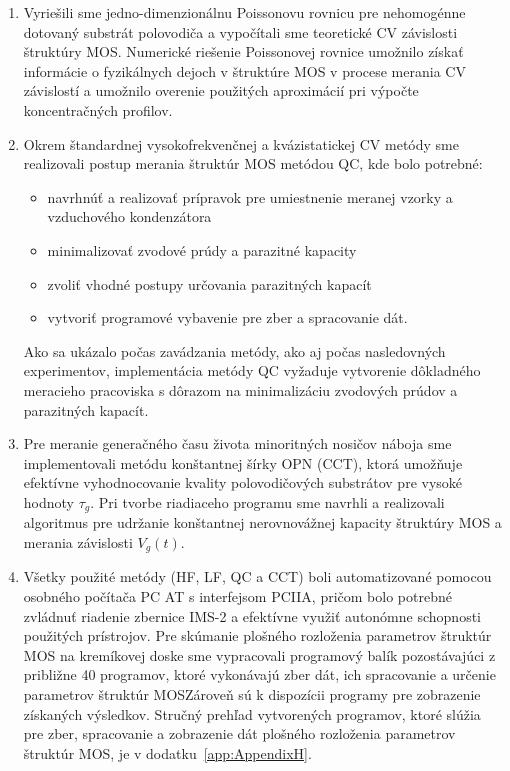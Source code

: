\begin{enumerate}

\item Vyriešili sme jedno-dimenzionálnu Poissonovu rovnicu pre
  nehomogénne dotovaný substrát polovodiča a vypočítali sme teoretické
  CV závislosti štruktúry MOS\@. Numerické riešenie Poissonovej
  rovnice umožnilo získať informácie o fyzikálnych dejoch v štruktúre
  MOS v procese merania CV závislostí a umožnilo overenie použitých
  aproximácií pri výpočte koncentračných profilov.

\item Okrem štandardnej vysokofrekvenčnej a kvázistatickej CV metódy
  sme realizovali postup merania štruktúr MOS metódou QC, kde bolo
  potrebné:

\begin{itemize}
\item navrhnúť a realizovať prípravok pre umiestnenie meranej vzorky a
  vzduchového kondenzátora
\item  minimalizovať zvodové prúdy a parazitné kapacity
\item zvoliť vhodné postupy určovania parazitných kapacít
\item vytvoriť programové vybavenie pre zber a spracovanie dát.
\end{itemize}

Ako sa ukázalo počas zavádzania metódy, ako aj počas nasledovných
experimentov, implementácia metódy QC vyžaduje vytvorenie dôkladného
meracieho pracoviska s dôrazom na minimalizáciu zvodových prúdov a
parazitných kapacít.

\item Pre meranie generačného času života minoritných nosičov náboja
  sme implementovali metódu konštantnej šírky OPN (CCT), ktorá
  umožňuje efektívne vyhodnocovanie kvality polovodičových substrátov
  pre vysoké hodnoty $\tau_{g}$. Pri tvorbe riadiaceho programu sme
  navrhli a realizovali algoritmus pre udržanie konštantnej
  nerovnovážnej kapacity štruktúry MOS a merania závislosti
  $V_{g}(t)$.

\item Všetky použité metódy (HF, LF, QC a CCT) boli automatizované
  pomocou osobného počítača PC AT s interfejsom PCIIA, pričom bolo
  potrebné zvládnuť riadenie zbernice IMS-2 a efektívne využiť
  autonómne schopnosti použitých prístrojov. Pre skúmanie plošného
  rozloženia parametrov štruktúr MOS na kremíkovej doske sme
  vypracovali programový balík pozostávajúci z približne 40 programov,
  ktoré vykonávajú zber dát, ich spracovanie a určenie parametrov
  štruktúr MOS\@  Zároveň sú k dispozícii programy pre zobrazenie
  získaných výsledkov. Stručný prehľad vytvorených programov, ktoré
  slúžia pre zber, spracovanie a zobrazenie dát plošného rozloženia
  parametrov štruktúr MOS, je v dodatku~\ref{app:AppendixH}.


\end{enumerate}
